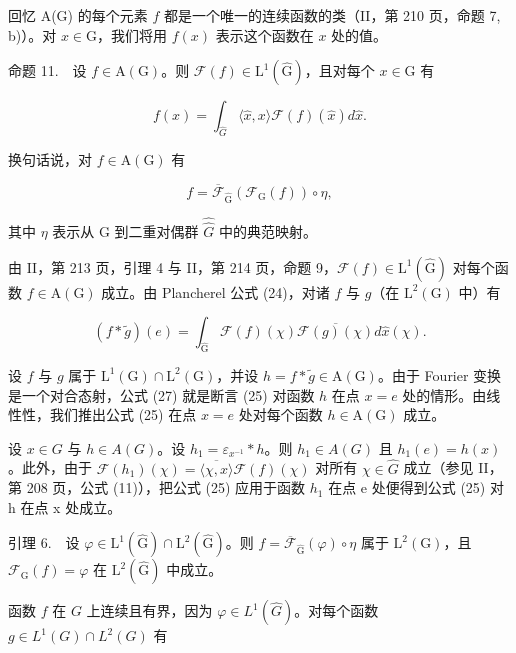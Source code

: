 回忆 A(G) 的每个元素 \(f\) 都是一个唯一的连续函数的类（II，第 210 页，命题 7, b)）。对 \(x \in \mathrm{G}\)，我们将用 \(f(x)\) 表示这个函数在 \(x\) 处的值。

命题 11.　设 \(f \in \mathrm{A}(\mathrm{G})\)。则 \(\mathcal{F}(f) \in \mathrm{L}^1(\widehat{\mathrm{G}})\)，且对每个 \(x \in \mathrm{G}\) 有

\[
f (x) = \int_ {\widehat {G}} \langle \widehat {x}, x \rangle \mathcal {F} (f) (\widehat {x}) d \widehat {x}.\tag{25}
\]

换句话说，对 \(f \in \mathrm{A}(\mathrm{G})\) 有

\[
f = \overline {{\mathcal {F}}} _ {\widehat {\mathrm{G}}} (\mathcal {F} _ {\mathrm{G}} (f)) \circ \eta ,\tag{26}
\]

其中 \(\eta\) 表示从 G 到二重对偶群 \(\widehat{\widehat{G}}\) 中的典范映射。

由 II，第 213 页，引理 4 与 II，第 214 页，命题 9，\(\mathcal{F}(f) \in \mathrm{L}^1(\widehat{\mathrm{G}})\) 对每个函数 \(f \in \mathrm{A}(\mathrm{G})\) 成立。由 Plancherel 公式 (24)，对诸 \(f\) 与 \(g\)（在 \(\mathrm{L}^2(\mathrm{G})\) 中）有

\[
(f * \widetilde {g}) (e) = \int_ {\widehat {\mathrm{G}}} \mathcal {F} (f) (\chi) \overline {{\mathcal {F} (g) (\chi)}} d \widehat {x} (\chi).\tag{27}
\]

设 \(f\) 与 \(g\) 属于 \(\mathrm{L}^1(\mathrm{G}) \cap \mathrm{L}^2(\mathrm{G})\)，并设 \(h = f * \widetilde{g} \in \mathrm{A}(\mathrm{G})\)。由于 Fourier 变换是一个对合态射，公式 (27) 就是断言 (25) 对函数 \(h\) 在点 \(x = e\) 处的情形。由线性性，我们推出公式 (25) 在点 \(x = e\) 处对每个函数 \(h \in \mathrm{A}(\mathrm{G})\) 成立。

设 \(x \in G\) 与 \(h \in A(G)\)。设 \(h_{1} = \varepsilon_{x^{-1}} * h\)。则 \(h_{1} \in A(G)\) 且 \(h_{1}(e) = h(x)\)。此外，由于 \(\mathcal{F}(h_{1})(\chi) = \overline{\langle\chi, x\rangle}\mathcal{F}(f)(\chi)\) 对所有 \(\chi \in \widehat{G}\) 成立（参见 II，第 208 页，公式 (11)），把公式 (25) 应用于函数 \(h_{1}\) 在点 e 处便得到公式 (25) 对 h 在点 x 处成立。

引理 6.　设 \(\varphi\in\mathrm{L}^{1}(\widehat{\mathrm{G}})\cap\mathrm{L}^{2}(\widehat{\mathrm{G}})\)。则 \(f=\overline{\mathcal{F}}_{\widehat{\mathrm{G}}}(\varphi)\circ\eta\) 属于 \(\mathrm{L}^{2}(\mathrm{G})\)，且 \(\mathcal{F}_{\mathrm{G}}(f)=\varphi\) 在 \(\mathrm{L}^{2}(\widehat{\mathrm{G}})\) 中成立。

函数 \(f\) 在 \(G\) 上连续且有界，因为 \(\varphi \in L^{1}(\widehat{G})\)。对每个函数 \(g \in L^{1}(G) \cap L^{2}(G)\) 有

